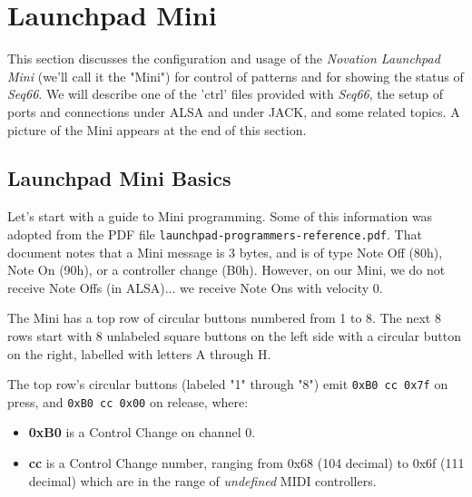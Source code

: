 
%
%
%

\section{Launchpad Mini}
\label{sec:launchpad_mini}

   This section discusses the configuration and usage of the
   \textsl{Novation Launchpad Mini} (we'll call it the "Mini")
   for control of patterns
   and for showing the status of \textsl{Seq66}.
   We will describe one of the 'ctrl' files provided with \textsl{Seq66},
   the setup of ports and connections 
   under ALSA and under JACK, and some related topics.
   A picture of the Mini appears at the end of this section.

\subsection{Launchpad Mini Basics}
\label{subsec:launchpad_mini_basics}

   Let's start with a guide to Mini programming.
   Some of this information was adopted from the PDF file
   \texttt{launchpad-programmers-reference.pdf}.
   That document notes that a Mini
   message is 3 bytes, and is of type Note Off (80h), Note On (90h), or a
   controller change (B0h).  However, on our Mini, we do not receive Note Offs
   (in ALSA)... we receive Note Ons with velocity 0.

   The Mini has a top row of circular buttons numbered from 1 to 8.
   The next 8 rows start with 8 unlabeled square buttons on the left side
   with a circular button on the right, labelled with letters A through H.

   The top row's circular buttons (labeled "1" through "8")
   emit \texttt{0xB0 cc 0x7f} on press, and
   \texttt{0xB0 cc 0x00} on release, where:

   \begin{itemize}
      \item \textbf{0xB0}
         is a Control Change on channel 0.
      \item \textbf{cc}
         is a Control Change number, ranging from 0x68 (104 decimal)
         to 0x6f (111 decimal) which are in the range of
            \textsl{undefined} MIDI controllers.
   \end{itemize}

